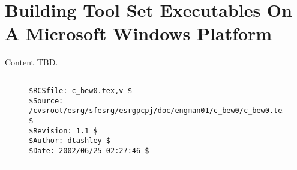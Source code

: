 %
\chapter{Building Tool Set Executables On A Microsoft Windows Platform}
\label{cbew0}

Content TBD.


\noindent\begin{figure}[!b]
\noindent\rule[-0.25in]{\textwidth}{1pt}
\begin{tiny}
\begin{verbatim}
$RCSfile: c_bew0.tex,v $
$Source: /cvsroot/esrg/sfesrg/esrgpcpj/doc/engman01/c_bew0/c_bew0.tex,v $
$Revision: 1.1 $
$Author: dtashley $
$Date: 2002/06/25 02:27:46 $
\end{verbatim}
\end{tiny}
\noindent\rule[0.25in]{\textwidth}{1pt}
\end{figure}
%
